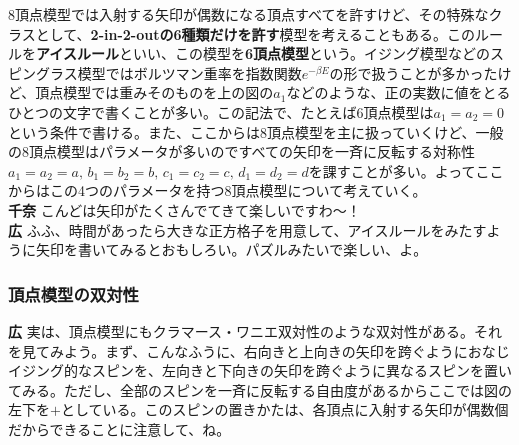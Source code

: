 \documentclass[paper=b5j,fontsize=12Q,jafontsize=12Q,baselineskip=21Q]{jlreq}
\DeclareRobustCommand{\hiron}{\textbf{広 }}
\DeclareRobustCommand{\chinan}{\textbf{千奈 }}
\begin{document}
\begin{refsection}
\begin{center}
\end{center}

8頂点模型では入射する矢印が偶数になる頂点すべてを許すけど、その特殊なクラスとして、\textbf{2-in-2-outの6種類だけを許す}模型を考えることもある。このルールを\textbf{アイスルール}といい、この模型を\textbf{6頂点模型}という。イジング模型などのスピングラス模型ではボルツマン重率を指数関数$e^{-\beta E}$の形で扱うことが多かったけど、頂点模型では重みそのものを上の図の$a_1$などのような、正の実数に値をとるひとつの文字で書くことが多い。この記法で、たとえば6頂点模型は$a_1=a_2=0$という条件で書ける。また、ここからは8頂点模型を主に扱っていくけど、一般の8頂点模型はパラメータが多いのですべての矢印を一斉に反転する対称性$a_1=a_2=a,\, b_1=b_2=b,\, c_1=c_2=c,\, d_1=d_2=d$を課すことが多い。よってここからはこの4つのパラメータを持つ8頂点模型について考えていく。
\\\chinan こんどは矢印がたくさんでてきて楽しいですわ〜！
\\\hiron ふふ、時間があったら大きな正方格子を用意して、アイスルールをみたすように矢印を書いてみるとおもしろい。パズルみたいで楽しい、よ。

\subsubsection{頂点模型の双対性}
\hiron 実は、頂点模型にもクラマース・ワニエ双対性のような双対性がある。それを見てみよう。まず、こんなふうに、右向きと上向きの矢印を跨ぐようにおなじイジング的なスピンを、左向きと下向きの矢印を跨ぐように異なるスピンを置いてみる。ただし、全部のスピンを一斉に反転する自由度があるからここでは図の左下を$+$としている。このスピンの置きかたは、各頂点に入射する矢印が偶数個だからできることに注意して、ね。


\end{refsection}
\end{document}
